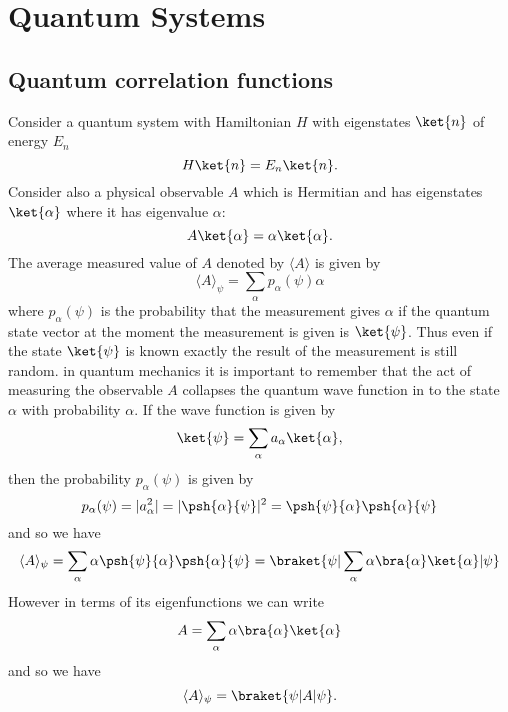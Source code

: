  
\chapter{Quantum Systems}
\section{Quantum correlation functions}
Consider a quantum system with Hamiltonian $H$ with eigenstates $\ket{n}$ of energy $E_n$
\begin{equation}
H\ket{n} = E_n \ket{n}. 
\end{equation}
Consider also a physical observable $A$ which is Hermitian and has eigenstates
$\ket{\alpha}$ where it has eigenvalue $\alpha$:
\begin{equation}
A\ket{\alpha} = \alpha \ket{\alpha}. 
\end{equation}
The average measured value of $A$ denoted by $\langle A\rangle$  is given by
\begin{equation}
\langle A\rangle_\psi = \sum_{\alpha} p_\alpha(\psi) \alpha
\end{equation}
where $p_\alpha(\psi)$ is the probability that the measurement gives $\alpha$ if the quantum state vector at the moment the measurement is given is $\ket{\psi}$. Thus even if the state $\ket{\psi}$ is known exactly the result of the measurement is still random.
in quantum mechanics it is important to remember that the act of measuring the observable $A$ collapses the quantum wave function in to the state $\alpha$ with probability $\alpha$.
If the wave function is given by
\begin{equation}
\ket{ \psi} = \sum_{\alpha} a_\alpha \ket{\alpha},
\end{equation} 
then the probability $p_\alpha(\psi)$ is given by
\begin{equation}
p_\alpha(\psi) = |a_\alpha^2| = |\psh{\alpha}{\psi}|^2 =\psh{\psi}{\alpha} \psh{\alpha}{\psi}
\end{equation}
and so we have
\begin{equation}
\langle A \rangle_\psi = \sum_\alpha \alpha \psh{\psi}{\alpha} \psh{\alpha}{\psi} = 
\braket{ \psi | \sum_\alpha \alpha \bra{\alpha}\ket{\alpha} |\psi}
\end{equation}
However in terms of its eigenfunctions we can write
\begin{equation}
A =\sum_\alpha \alpha \bra{\alpha}\ket{\alpha}
\end{equation}
and so we have
\begin{equation}
\langle A \rangle_\psi  = \braket{ \psi | A|\psi}.
\end{equation}
